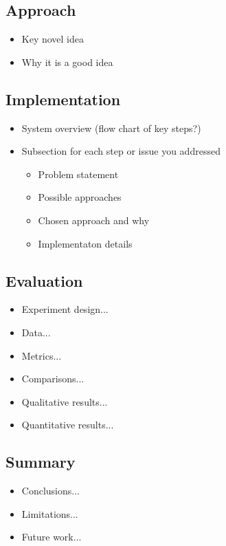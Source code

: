 \documentclass[pageno]{jpaper}
\begin{document}
\subsection{Approach}
\begin{itemize}
  \item Key novel idea
  \item Why it is a good idea
\end{itemize}

\subsection{Implementation}
\begin{itemize}
  \item System overview (flow chart of key steps?)
  \item Subsection for each step or issue you addressed
        \begin{itemize}
          \item Problem statement
          \item Possible approaches
          \item Chosen approach and why
          \item Implementaton details
        \end{itemize}
\end{itemize}

\subsection{Evaluation}
\begin{itemize}
  \item Experiment design...
  \item Data...
  \item Metrics...
  \item Comparisons...
  \item Qualitative results...
  \item Quantitative results...
\end{itemize}

\subsection{Summary}
\begin{itemize}
  \item Conclusions...
  \item Limitations...
  \item Future work...
\end{itemize}
\end{document}
